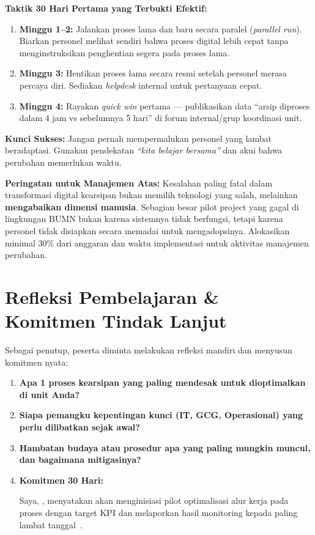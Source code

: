 \documentclass[12pt,a4paper]{report}
\begin{document}
\begin{plnbox}
\textbf{Taktik 30 Hari Pertama yang Terbukti Efektif:}
\begin{enumerate}[nosep, leftmargin=*]
    \item \textbf{Minggu 1--2:} Jalankan proses lama dan baru secara paralel (\textit{parallel run}). Biarkan personel melihat sendiri bahwa proses digital lebih cepat tanpa menginstruksikan penghentian segera pada proses lama.
    \item \textbf{Minggu 3:} Hentikan proses lama secara resmi setelah personel merasa percaya diri. Sediakan \textit{helpdesk} internal untuk pertanyaan cepat.
    \item \textbf{Minggu 4:} Rayakan \textit{quick win} pertama --- publikasikan data ``arsip diproses dalam 4 jam vs sebelumnya 5 hari'' di forum internal/grup koordinasi unit.
\end{enumerate}
\textbf{Kunci Sukses:} Jangan pernah mempermalukan personel yang lambat beradaptasi. Gunakan pendekatan \textit{``kita belajar bersama''} dan akui bahwa perubahan memerlukan waktu.
\end{plnbox}

\begin{warnbox}
\textbf{Peringatan untuk Manajemen Atas:} Kesalahan paling fatal dalam transformasi digital kearsipan bukan memilih teknologi yang salah, melainkan \textbf{mengabaikan dimensi manusia}. Sebagian besar pilot project yang gagal di lingkungan BUMN bukan karena sistemnya tidak berfungsi, tetapi karena personel tidak disiapkan secara memadai untuk mengadopsinya. Alokasikan minimal 30\% dari anggaran dan waktu implementasi untuk aktivitas manajemen perubahan.
\end{warnbox}

\section{Refleksi Pembelajaran \& Komitmen Tindak Lanjut}
Sebagai penutup, peserta diminta melakukan refleksi mandiri dan menyusun komitmen nyata:

\begin{enumerate}[leftmargin=*]
    \item \textbf{Apa 1 proses kearsipan yang paling mendesak untuk dioptimalkan di unit Anda?}
    \item \textbf{Siapa pemangku kepentingan kunci (IT, GCG, Operasional) yang perlu dilibatkan sejak awal?}
    \item \textbf{Hambatan budaya atau prosedur apa yang paling mungkin muncul, dan bagaimana mitigasinya?}
    \item \textbf{Komitmen 30 Hari:}

    Saya, \underline{\hspace{3.5cm}}, menyatakan akan menginisiasi pilot optimalisasi alur kerja pada proses \underline{\hspace{3.5cm}} dengan target KPI \underline{\hspace{3cm}} dan melaporkan hasil monitoring kepada \underline{\hspace{3cm}} paling lambat tanggal~\underline{\hspace{2.5cm}}.
\end{enumerate}
\end{document}
